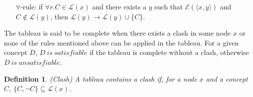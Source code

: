 \documentclass{article}
\newtheorem{mydef}{Definition}
\begin{document}
\begin{itemize}
\item[$\forall$-rule:] if $\forall r.C\in \mathcal{L}(x)$ and there exists a $y$ such that $\mathcal{E}(\langle x,y \rangle)$ and $C\notin \mathcal{L}(y)$,
then $ \mathcal{L}(y)\rightarrow  \mathcal{L}(y)\cup \{C\}$.
\begin{center}
\end{center}
\end{itemize}


The tableau is said to be complete  when there exists a clash in some node $x$ or none of the rules mentioned above can be applied in the tableau. 
For a given concept $D$, $D ~ is ~ satisfiable$ if the tableau is complete without a clash, otherwise   $D ~ is ~ unsatisfiable$.

\begin{mydef}(Clash)
A tableau contains a clash if, for a node $x$ and a concept $C$, $\{C,\neg C\}\subseteq \mathcal{L}(x)$.
\end{mydef}
\begin{center}
\end{center}
\end{document}
